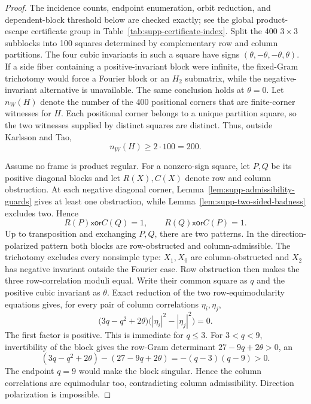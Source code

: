\begin{proof}
The incidence counts, endpoint enumeration, orbit reduction, and dependent-block threshold below are checked exactly; see the global product-escape certificate group in Table~\ref{tab:supp-certificate-index}.
Split the 400 $3\times3$ subblocks into 100 squares determined by complementary row and column partitions.  The four cubic invariants in such a square have signs $(\theta,-\theta,-\theta,\theta)$.  If a side fiber containing a positive-invariant block were infinite, the fixed-Gram trichotomy would force a Fourier block or an $H_2$ submatrix, while the negative-invariant alternative is unavailable. The same conclusion holds at $\theta=0$. Let $n_W(H)$ denote the number of the 400 positional corners that are finite-corner witnesses for $H$. Each positional corner belongs to a unique partition square, so the two witnesses supplied by distinct squares are distinct. Thus, outside Karlsson and Tao,
\begin{equation}
n_W(H)\ge 2\cdot100=200.
\label{eq:supp-witness-multiplicity}
\end{equation}

{Assume no frame is product regular.  For a nonzero-sign square, let $P,Q$ be its positive diagonal blocks and let $R(X),C(X)$ denote row and column obstruction.  At each negative diagonal corner, Lemma~\ref{lem:supp-admissibility-guards} gives at least one obstruction, while Lemma~\ref{lem:supp-two-sided-badness} excludes two. Hence}
\begin{equation}
R(P)\mathbin{\mathsf{xor}}C(Q)=1,
\qquad
R(Q)\mathbin{\mathsf{xor}}C(P)=1.
\label{eq:supp-badness-xor}
\end{equation}
Up to transposition and exchanging $P,Q$, there are two patterns.  In the direction-polarized pattern both blocks are {row-obstructed and column-admissible}.  {The trichotomy excludes every nonsimple type: $X_1,X_0$ are column-obstructed and $X_2$ has negative invariant outside the Fourier case.}  {Row obstruction} then makes the three row-correlation moduli equal. Write their common square as $q$ and the positive cubic invariant as $\theta$. Exact reduction of the two row-equimodularity equations gives, for every pair of column correlations $\eta_i,\eta_j$,
\begin{equation}
\bigl(3q-q^2+2\theta\bigr)
\bigl(|\eta_i|^2-|\eta_j|^2\bigr)=0.
\label{eq:supp-direction-polarization}
\end{equation}
The first factor is positive. This is immediate for $q\leq3$. For $3<q<9$, invertibility of the block gives the row-Gram determinant $27-9q+2\theta>0$, an
\begin{equation}
(3q-q^2+2\theta)-(27-9q+2\theta)=-(q-3)(q-9)>0.
\end{equation}
The endpoint $q=9$ would make the block singular. Hence the column correlations are equimodular too, contradicting column admissibility. Direction polarization is impossible.


\end{proof}
